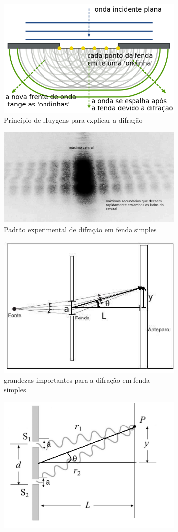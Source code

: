 \documentclass[a4paper,11pt]{article}
\begin{document}
\begin{figure}[H]

	\begin{subfigure}[!htp]{0.5\textwidth}
		\includegraphics[width = 6 cm]{./images/Huygens-Principle.png}
		\caption{Princípio de Huygens para explicar a difração}
		\label{fig:intro-huygens}
	\end{subfigure}
\hspace{1 cm}	
	\begin{subfigure}[!htp]{0.5\textwidth}
		\includegraphics[width = 8 cm]{./images/single-slit-pattern.jpg}
		\caption{Padrão experimental de difração em fenda simples}
		\label{fig:single-slit-pattern}
	\end{subfigure}
%
\vspace{1 cm}
%
	\begin{subfigure}[!htp]{0.5\textwidth}
	\includegraphics[width = 6 cm]{./images/single-slit-schematic.jpg}
		\caption{grandezas importantes para a difração em fenda simples}
		\label{fig:single-slit-schematic}
	\end{subfigure}
\hspace{1 cm}	
	\begin{subfigure}[!htp]{0.5\textwidth}
	\includegraphics[width = 6 cm]{./images/MIT-double-slit-schematic.png}

\end{subfigure}
\end{figure}
\end{document}
